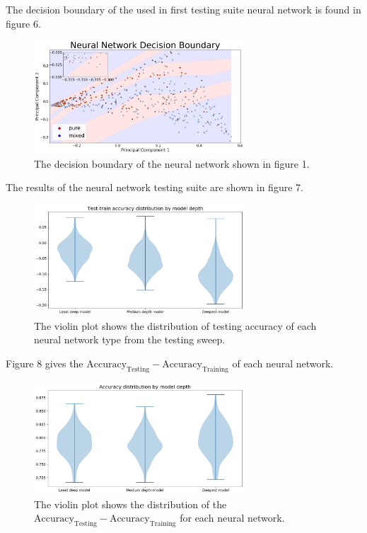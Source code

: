 \documentclass[12pt]{article}
\begin{document}
  The decision boundary of the used in first testing suite neural network is found in figure 6.  
  
     \begin{figure}[H]
 \centering
  \includegraphics[width=0.7\textwidth]{decboundary}
  \caption{The decision boundary of the neural network shown in figure 1.}
  \end{figure}
  
  The results of the neural network testing suite are shown in figure 7.  
  
   \begin{figure}[H]
 \centering
  \includegraphics[width=0.7\textwidth]{testOut1289}
  \caption{The violin plot shows the distribution of testing accuracy of each neural network type from the testing sweep.}
  \end{figure}
  
  Figure 8 gives the  $\text{Accuracy}_{\text{Testing}} - \text{Accuracy}_{\text{Training}}$ of each neural network.  
  
     \begin{figure}[H]
 \centering
  \includegraphics[width=0.7\textwidth]{testOut128}
  \caption{The violin plot shows the distribution of the $\text{Accuracy}_{\text{Testing}} - \text{Accuracy}_{\text{Training}}$
for each neural network. }
  \end{figure}
  
\end{document}
